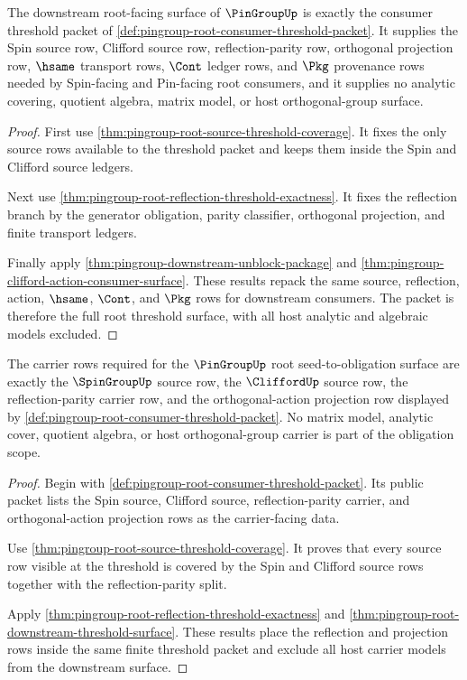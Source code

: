 \begin{theorem}
\label{thm:pingroup-root-downstream-threshold-surface}
The downstream root-facing surface of $\PinGroupUp$ is exactly the consumer
threshold packet of
\autoref{def:pingroup-root-consumer-threshold-packet}. It supplies the Spin
source row, Clifford source row, reflection-parity row, orthogonal projection
row, $\hsame$ transport rows, $\Cont$ ledger rows, and $\Pkg$ provenance rows
needed by Spin-facing and Pin-facing root consumers, and it supplies no
analytic covering, quotient algebra, matrix model, or host orthogonal-group
surface.
\end{theorem}
\begin{proof}
First use \autoref{thm:pingroup-root-source-threshold-coverage}. It fixes the
only source rows available to the threshold packet and keeps them inside the
Spin and Clifford source ledgers.

Next use \autoref{thm:pingroup-root-reflection-threshold-exactness}. It fixes
the reflection branch by the generator obligation, parity classifier,
orthogonal projection, and finite transport ledgers.

Finally apply \autoref{thm:pingroup-downstream-unblock-package} and
\autoref{thm:pingroup-clifford-action-consumer-surface}. These results repack
the same source, reflection, action, $\hsame$, $\Cont$, and $\Pkg$ rows for
downstream consumers. The packet is therefore the full root threshold surface,
with all host analytic and algebraic models excluded.
\end{proof}

\begin{theorem}
\label{thm:pingroup-root-carrier-obligation-scope}
The carrier rows required for the $\PinGroupUp$ root
seed-to-obligation surface are exactly the $\SpinGroupUp$ source row, the
$\CliffordUp$ source row, the reflection-parity carrier row, and the
orthogonal-action projection row displayed by
\autoref{def:pingroup-root-consumer-threshold-packet}. No matrix model,
analytic cover, quotient algebra, or host orthogonal-group carrier is part of
the obligation scope.
\end{theorem}
\begin{proof}
Begin with \autoref{def:pingroup-root-consumer-threshold-packet}. Its public
packet lists the Spin source, Clifford source, reflection-parity carrier, and
orthogonal-action projection rows as the carrier-facing data.

Use \autoref{thm:pingroup-root-source-threshold-coverage}. It proves that
every source row visible at the threshold is covered by the Spin and Clifford
source rows together with the reflection-parity split.

Apply \autoref{thm:pingroup-root-reflection-threshold-exactness} and
\autoref{thm:pingroup-root-downstream-threshold-surface}. These results place
the reflection and projection rows inside the same finite threshold packet and
exclude all host carrier models from the downstream surface.
\end{proof}

